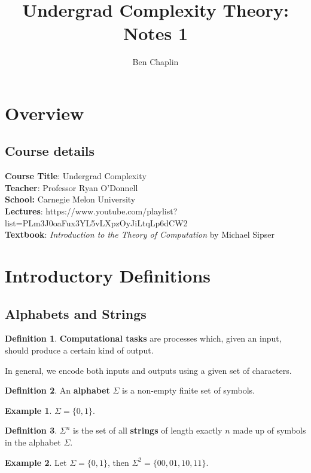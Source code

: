 \documentclass[11pt]{article}
\title{Undergrad Complexity Theory: Notes 1}
\author{Ben Chaplin}
\date{}
\theoremstyle{plain}
\theoremstyle{definition}
\newtheorem*{defn}{Definition}
\newtheorem*{ex}{Example}
\begin{document}
\maketitle
\tableofcontents

\section{Overview}
\subsection{Course details}

{\bf Course Title}: Undergrad Complexity\\
{\bf Teacher}: Professor Ryan O'Donnell \\
{\bf School:} Carnegie Melon University\\
{\bf Lectures}: https://www.youtube.com/playlist?list=PLm3J0oaFux3YL5vLXpzOyJiLtqLp6dCW2\\
{\bf Textbook}: {\it Introduction to the Theory of Computation} by Michael Sipser

\section{Introductory Definitions}
\subsection{Alphabets and Strings}

\begin{defn}
    {\bf Computational tasks} are processes which, given an input, should produce a certain kind of 
    output.
\end{defn}

In general, we encode both inputs and outputs using a given set of characters.

\begin{defn}
    An {\bf alphabet} $\Sigma$ is a non-empty finite set of symbols.
\end{defn}

\begin{ex}
    $\Sigma = \{0, 1\}$.
\end{ex}

\begin{defn}
    $\Sigma^n$ is the set of all {\bf strings} of length exactly $n$ made up of symbols in the
    alphabet $\Sigma$.
\end{defn}

\begin{ex}
    Let $\Sigma = \{0, 1\}$, then $\Sigma^2 = \{00, 01, 10, 11\}$.
\end{ex}
\end{document}
